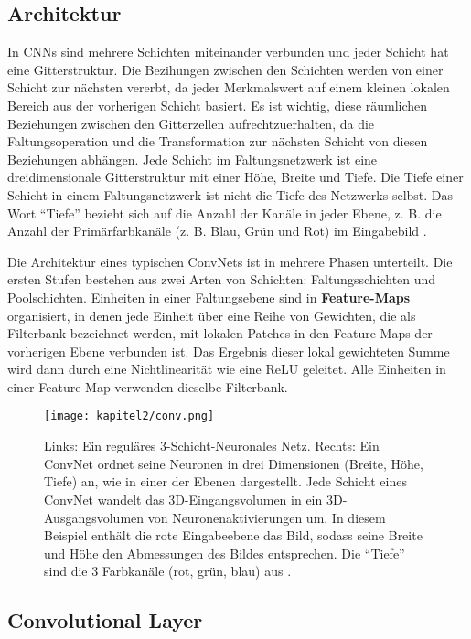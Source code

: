     \subsection{Architektur}
    In CNNs sind mehrere Schichten miteinander verbunden und jeder Schicht hat eine Gitterstruktur. Die Bezihungen zwischen den Schichten werden von einer Schicht zur nächsten vererbt, da jeder Merkmalswert auf einem kleinen lokalen Bereich aus der vorherigen Schicht basiert. Es ist wichtig, diese räumlichen Beziehungen zwischen den Gitterzellen aufrechtzuerhalten, da die Faltungsoperation und die Transformation zur nächsten Schicht von diesen Beziehungen abhängen. Jede Schicht im Faltungsnetzwerk ist eine dreidimensionale Gitterstruktur mit einer Höhe, Breite und Tiefe. Die Tiefe einer Schicht in einem Faltungsnetzwerk ist nicht die Tiefe des Netzwerks selbst. Das Wort \enquote{Tiefe} bezieht sich auf die Anzahl der Kanäle in jeder Ebene, z. B. die Anzahl der Primärfarbkanäle (z. B. Blau, Grün und Rot) im Eingabebild \cite*[318]{Aggarwal2018}.

    Die Architektur eines typischen ConvNets ist in mehrere Phasen unterteilt. Die ersten Stufen bestehen aus zwei Arten von Schichten: Faltungsschichten und Poolschichten. Einheiten in einer Faltungsebene sind in \textbf{Feature-Maps} organisiert, in denen jede Einheit über eine Reihe von Gewichten, die als Filterbank bezeichnet werden, mit lokalen Patches in den Feature-Maps der vorherigen Ebene verbunden ist. Das Ergebnis dieser lokal gewichteten Summe wird dann durch eine Nichtlinearität wie \zb eine ReLU geleitet. Alle Einheiten in einer Feature-Map verwenden dieselbe Filterbank\cite*{Lecun2015}.


    \begin{figure}[H]
        \centering
        \texttt{[image: kapitel2/conv.png]}
        \caption[Vergleich eines NN mit einem CNN]{Links: Ein reguläres 3-Schicht-Neuronales Netz. Rechts: Ein ConvNet ordnet seine Neuronen in drei Dimensionen (Breite, Höhe, Tiefe) an, wie in einer der Ebenen dargestellt. Jede Schicht eines ConvNet wandelt das 3D-Eingangsvolumen in ein 3D-Ausgangsvolumen von Neuronenaktivierungen um. In diesem Beispiel enthält die rote Eingabeebene das Bild, sodass seine Breite und Höhe den Abmessungen des Bildes entsprechen. Die \enquote{Tiefe} sind die 3 Farbkanäle (rot, grün, blau) aus \cite*{StanfordUniversityCoursecs231n2018a}.}
        \label{Kap2:Conv}
    \end{figure}


    \subsection{Convolutional Layer}

